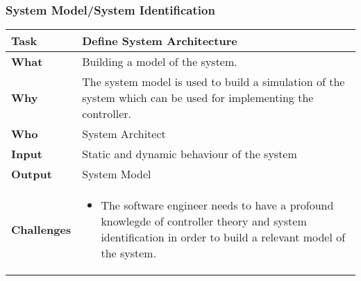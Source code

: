 \subsubsection{System Model/System Identification}
\begin{minipage}{\textwidth}
	 \label{table:ch6_Task_Controler_Tuning} 
	\begin{tabular}
		{|m{3cm}|m{10cm}|} \hline \bfseries Task & Define System Architecture\\
		\hline \bfseries What & Building a model of the system.\\
		\hline \bfseries Why & The system model is used to build a simulation of the system which can be used for implementing the controller.\\
		\hline \bfseries Who & System Architect\\
		\hline \bfseries Input & Static and dynamic behaviour of the system\\ 
		\hline \bfseries Output & System Model\\
		\hline \bfseries Challenges & 
		\begin{itemize}
			\item The software engineer needs to have a profound knowlegde of controller theory and system identification in order to build a relevant model of the system.
		\end{itemize}
		\\
		\hline 
	\end{tabular}
\end{minipage}

